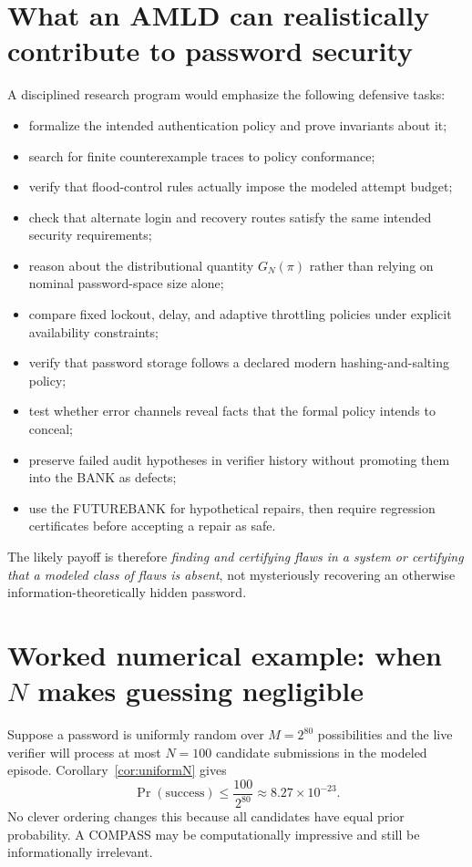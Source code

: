\documentclass[11pt,openany]{book}
\theoremstyle{definition}
\theoremstyle{remark}
\begin{document}
\section{What an AMLD can realistically contribute to password security}
A disciplined research program would emphasize the following defensive tasks:
\begin{itemize}
\item formalize the intended authentication policy and prove invariants about it;
\item search for finite counterexample traces to policy conformance;
\item verify that flood-control rules actually impose the modeled attempt budget;
\item check that alternate login and recovery routes satisfy the same intended security requirements;
\item reason about the distributional quantity $G_N(\pi)$ rather than relying on nominal password-space size alone;
\item compare fixed lockout, delay, and adaptive throttling policies under explicit availability constraints;
\item verify that password storage follows a declared modern hashing-and-salting policy;
\item test whether error channels reveal facts that the formal policy intends to conceal;
\item preserve failed audit hypotheses in verifier history without promoting them into the BANK as defects;
\item use the FUTUREBANK for hypothetical repairs, then require regression certificates before accepting a repair as safe.
\end{itemize}

The likely payoff is therefore \emph{finding and certifying flaws in a system or certifying that a modeled class of flaws is absent}, not mysteriously recovering an otherwise information-theoretically hidden password.

\section{Worked numerical example: when \texorpdfstring{$N$}{N} makes guessing negligible}
Suppose a password is uniformly random over $M=2^{80}$ possibilities and the live verifier will process at most $N=100$ candidate submissions in the modeled episode. Corollary~\ref{cor:uniformN} gives
\[
\Pr(\text{success})\le \frac{100}{2^{80}}\approx 8.27\times 10^{-23}.
\]
No clever ordering changes this because all candidates have equal prior probability. A COMPASS may be computationally impressive and still be informationally irrelevant.
\end{document}
